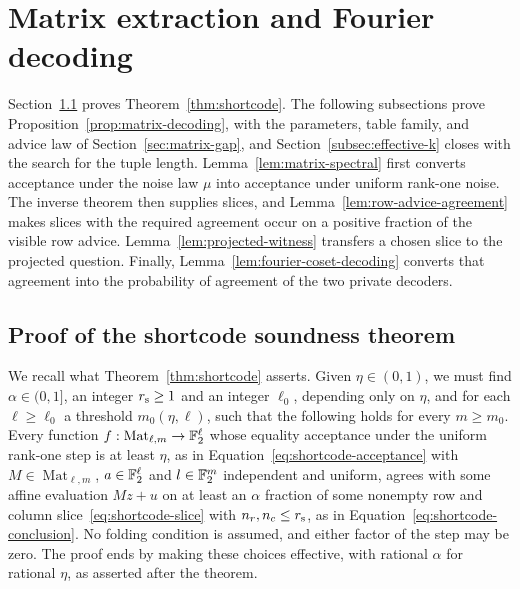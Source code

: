 \section{Matrix extraction and Fourier decoding}
\label{sec:matrix}

Section~\ref{subsec:shortcode-proof} proves Theorem~\ref{thm:shortcode}.
The following subsections prove Proposition~\ref{prop:matrix-decoding},
with the parameters, table family, and advice law of
Section~\ref{sec:matrix-gap}, and Section~\ref{subsec:effective-k} closes
with the search for the tuple length.
Lemma~\ref{lem:matrix-spectral} first converts acceptance under the noise law $\mu$ into acceptance under uniform rank-one noise.  The inverse theorem
then supplies slices, and Lemma~\ref{lem:row-advice-agreement} makes slices with the required agreement
occur on a positive fraction of the visible row advice.
Lemma~\ref{lem:projected-witness} transfers a chosen slice to the projected
question.  Finally, Lemma~\ref{lem:fourier-coset-decoding} converts that
agreement into the probability of agreement of the two private decoders.

\subsection{Proof of the shortcode soundness theorem}\label{subsec:shortcode-proof}

We recall what Theorem~\ref{thm:shortcode} asserts.  Given
$\eta\in(0,1)$, we must find $\alpha\in(0,1]$, an integer
$r_{\rm s}\ge1$ and an integer $\ell_0$, depending only on $\eta$, and
for each $\ell\ge\ell_0$ a threshold $m_0(\eta,\ell)$, such that the
following holds for every $m\ge m_0$.  Every function
$f:\operatorname{Mat}_{\ell,m}\to\mathbb F_2^\ell$ whose equality acceptance
under the uniform rank-one step is at least $\eta$, as in
Equation~\eqref{eq:shortcode-acceptance} with $M\in\operatorname{Mat}_{\ell,m}$, $a\in\mathbb F_2^\ell$ and
$l\in\mathbb F_2^m$ independent and uniform, agrees with some affine
evaluation $Mz+u$ on at least an $\alpha$ fraction of some nonempty row
and column slice~\eqref{eq:shortcode-slice} with
$n_r,n_c\le r_{\rm s}$, as in Equation~\eqref{eq:shortcode-conclusion}.
No folding condition is assumed, and either factor of the step may be
zero.  The proof ends by making these choices effective, with rational
$\alpha$ for rational $\eta$, as asserted after the theorem.

